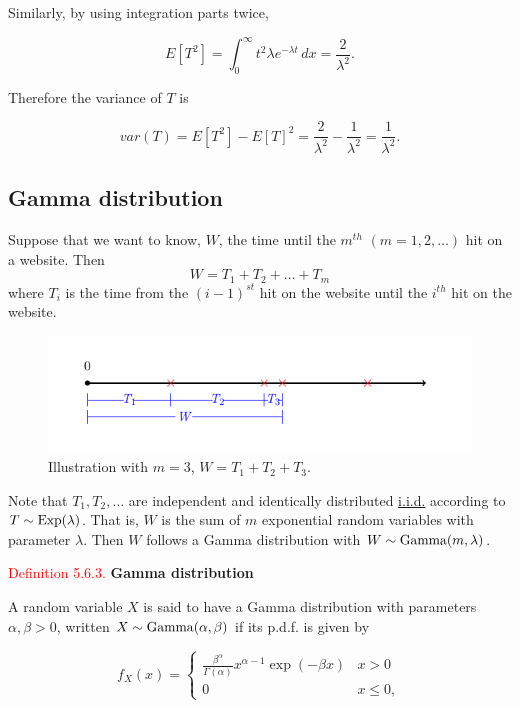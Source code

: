 \documentclass[
]{book}
\begin{document}
Similarly, by using integration parts twice,

\[ E[T^2] = \int_0^\infty
t^2 \lambda e^{- \lambda t} \, dx = \frac{2}{\lambda^2}. \]

Therefore
the variance of \(T\) is

\[ var (T) = E[T^2] - E[T]^2 = \frac{2}{\lambda^2} -
\frac{1}{\lambda^2} = \frac{1}{\lambda^2}. \]

\hfill\break

\hypertarget{rv:exponential:gamma}{%
\subsection{Gamma distribution}\label{rv:exponential:gamma}}

Suppose that we want to know, \(W\), the time until the \(m^{th}\) \((m=1,2,\ldots)\) hit on a website. Then \[W=T_1 + T_2 + \ldots + T_m \]
where \(T_i\) is the time from the \((i-1)^{st}\) hit on the website until the \(i^{th}\) hit on the website.

\begin{figure}
\includegraphics[width=1\linewidth]{Images/Gamma1} \caption{Illustration with $m=3$, $W=T_1 +T_2 +T_3$.}\label{fig:gamma1}
\end{figure}

Note that \(T_1,T_2, \ldots\) are independent and identically distributed \protect\hyperlink{rv:def:iid}{i.i.d.} according to \(T \sim {\rm Exp} (\lambda)\). That is, \(W\) is the sum of \(m\) exponential random variables with parameter \(\lambda\). Then \(W\) follows a Gamma distribution with \(W \sim {\rm Gamma} (m,\lambda)\).

\leavevmode{}%
\textcolor{red}{Definition 5.6.3.}
{\textbf{Gamma distribution}}

A random variable \(X\) is said to have a Gamma distribution with
parameters \(\alpha, \beta > 0\), written \(X \sim {\rm Gamma} (\alpha, \beta)\)
if its p.d.f. is given by

\[ f_X (x) = \left\{ \begin{array}{ll} \frac{\beta^\alpha}{\Gamma (\alpha)}
x^{\alpha -1} \exp(- \beta x) & x>0 \\
0 & x \leq 0, \end{array} \right. \]
\end{document}
